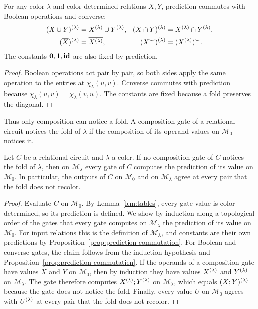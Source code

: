 \begin{proposition}\label{prop:prediction-commutation}
For any color $\lambda$ and color-determined relations $X,Y$, prediction
commutes with Boolean operations and converse:
\[
\begin{aligned}
 (X\cup Y)^{(\lambda)}&=X^{(\lambda)}\cup Y^{(\lambda)},&
 (X\cap Y)^{(\lambda)}&=X^{(\lambda)}\cap Y^{(\lambda)},\\
 (\overline X)^{(\lambda)}&=\overline{X^{(\lambda)}},&
 (X^\smile)^{(\lambda)}&=(X^{(\lambda)})^\smile.
\end{aligned}
\]
The constants $\mathbf{0},\mathbf{1},\mathbf{id}$ are also fixed by prediction.
\end{proposition}
\begin{proof}
Boolean operations act pair by pair, so both sides apply the same
operation to the entries at $\chi_\lambda(u,v)$. Converse commutes with
prediction because $\chi_\lambda(u,v)=\chi_\lambda(v,u)$. The constants
are fixed because a fold preserves the diagonal.
\end{proof}

Thus only composition can notice a fold. A composition gate of a
relational circuit notices the fold of $\lambda$ if the composition of
its operand values on $\mathcal M_0$ notices it.
\begin{lemma}\label{lem:unnoticed}
Let $C$ be a relational circuit and $\lambda$ a color. If no composition
gate of $C$ notices the fold of $\lambda$, then on $\mathcal M_\lambda$
every gate of $C$ computes the prediction of its value on $\mathcal M_0$.
In particular, the outputs of $C$ on $\mathcal M_0$ and on
$\mathcal M_\lambda$ agree at every pair that the fold does not recolor.
\end{lemma}
\begin{proof}
Evaluate $C$ on $\mathcal M_0$. By Lemma~\ref{lem:tables}, every gate
value is color-determined, so its prediction is defined. We show by
induction along a topological order of the gates that every gate computes
on $\mathcal M_\lambda$ the prediction of its value on $\mathcal M_0$. For
input relations this is the definition of $\mathcal M_\lambda$, and
constants are their own predictions by Proposition~\ref{prop:prediction-commutation}.
For Boolean and converse gates, the claim follows from the induction
hypothesis and Proposition~\ref{prop:prediction-commutation}.
If the operands of a composition gate have values $X$ and $Y$ on
$\mathcal M_0$, then by induction they have values $X^{(\lambda)}$ and $Y^{(\lambda)}$ on
$\mathcal M_\lambda$. The gate therefore computes
$X^{(\lambda)};Y^{(\lambda)}$ on $\mathcal M_\lambda$, which equals
$(X;Y)^{(\lambda)}$ because the gate does not notice the fold. Finally,
every value $U$ on $\mathcal M_0$ agrees with $U^{(\lambda)}$ at every
pair that the fold does not recolor.
\end{proof}

